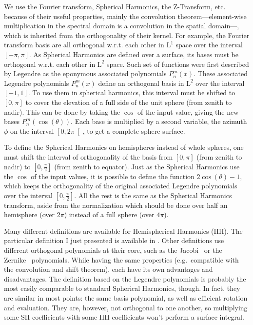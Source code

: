 \documentclass{report}
\begin{document}
We use the Fourier transform, Spherical Harmonics, the Z-Transform, etc. because of their useful properties, mainly the convolution theorem---element-wise multiplication in the spectral domain is a convolution in the spatial domain---, which is inherited from the orthogonality of their kernel. For example, the Fourier transform basis are all orthogonal w.r.t. each other in $\mathrm{L}^1$ space over the interval $\left[-\pi, \pi\right]$. As Spherical Harmonics are defined over a surface, its bases must be orthogonal w.r.t. each other in $\mathrm{L}^2$ space. Such set of functions were first described by Legendre as the eponymous associated polynomials $P_n^m(x)$. These associated Legendre polynomials $P_n^m(x)$ define an orthogonal basis in $\mathrm{L}^2$ over the interval $\left[ -1, 1 \right]$. To use them in spherical harmonics, this interval must be shifted to $\left[ 0, \pi \right]$ to cover the elevation of a full side of the unit sphere (from zenith to nadir). This can be done by taking the $\cos$ of the input value, giving the new bases $P_n^m\left(\cos(\theta)\right)$. Each base is multiplied by a second variable, the azimuth $\phi$ on the interval $\left[ 0, 2\pi \right[$, to get a complete sphere surface.

To define the Spherical Harmonics on hemispheres instead of whole spheres, one must shift the interval of orthogonality of the basis from $\left[ 0, \pi \right]$ (from zenith to nadir) to $\left[ 0, \frac{\pi}{2} \right]$ (from zenith to equator). Just as the Spherical Harmonics use the $\cos$ of the input values, it is possible to define the function $2\cos(\theta)-1$, which keeps the orthogonality of the original associated Legendre polynomials over the interval $\left[ 0, \frac{\pi}{2} \right]$. All the rest is the same as the Spherical Harmonics transform, aside from the normalization which should be done over half an hemisphere (over $2\pi$) instead of a full sphere (over $4\pi$).

Many different definitions are available for Hemispherical Harmonics (HH). The particular definition I just presented is available in \cite{Gautron2004}. Other definitions use different orthogonal polynomials at their core, such as the Jacobi~\cite{Makhotkin1996} or the Zernike~\cite{Koenderink1996} polynomials. While having the same properties (e.g.\ compatible with the convolution and shift theorem), each have its own advantages and disadvantages. The definition based on the Legendre polynomials is probably the most easily comparable to standard Spherical Harmonics, though. In fact, they are similar in most points: the same basis polynomial, as well as efficient rotation and evaluation. They are, however, not orthogonal to one another, so multiplying some SH coefficients with some HH coefficients won't perform a surface integral.
\end{document}
